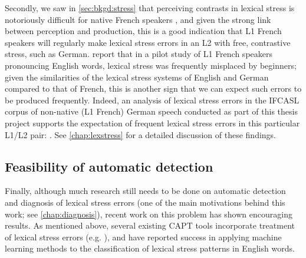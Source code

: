 Secondly, we saw in \cref{sec:bkgd:stress} that perceiving contrasts in lexical stress is notoriously difficult for native French speakers \citep{Cutler2005,Dupoux2008}, and given the strong link between perception and production,
this is a good indication that L1 French speakers will regularly make lexical stress errors in an L2 with free, contrastive stress, such as German. \textcite{Bonneau2011} report that in a pilot study of L1 French speakers pronouncing English words, lexical stress was frequently misplaced by beginners; given the similarities of the lexical stress systems of English and German compared to that of French, this is another sign that we can expect such errors to be produced frequently.
%
Indeed, an analysis of lexical stress errors in the IFCASL corpus of non-native (L1 French) German speech conducted as part of this thesis project supports the expectation of frequent lexical stress errors in this particular L1/L2 pair: . See \cref{chap:lexstress} for a detailed discussion of these findings.
	

		\subsection{Feasibility of automatic detection}
		\label{sec:targeting:autodetect}

Finally, although much research still needs to be done on automatic detection and diagnosis of lexical stress errors (one of the main motivations behind this work; see \cref{chap:diagnosis}), recent work on this problem has shown encouraging results. As mentioned above, several existing CAPT tools incorporate treatment of lexical stress errors (e.g. \cite{Wik2009,Bonneau2011}), and \textcite{Shahin2012a,Kim2011} have reported success in applying machine learning methods to the classification of lexical stress patterns in English words. 





